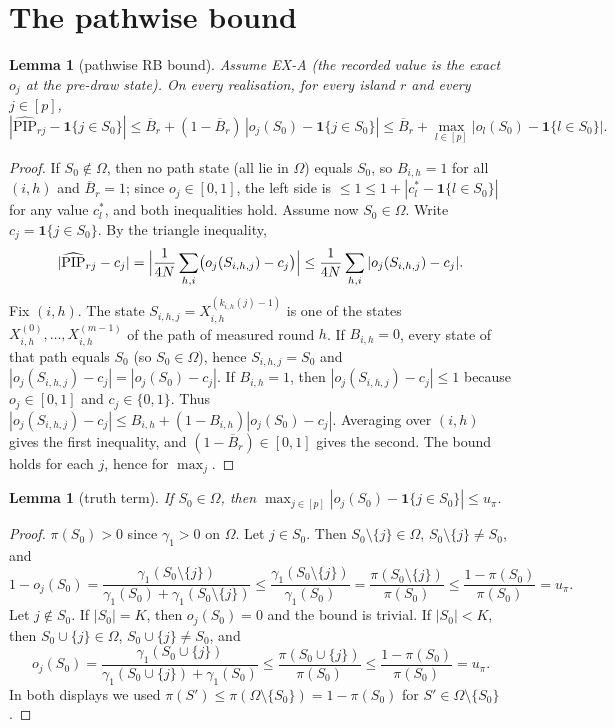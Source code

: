 \documentclass[11pt]{article}
\newtheorem{lemma}[theorem]{Lemma}
\theoremstyle{remark}
\newcommand{\one}{\mathbf 1}
\newcommand{\PIP}{\widehat{\mathrm{PIP}}}
\begin{document}
\section{The pathwise bound}

\begin{lemma}[pathwise RB bound]\label{lem:pathwise}
Assume EX-A (the recorded value is the exact $o_j$ at the pre-draw state). On every realisation, for every island $r$ and every $j\in[p]$,
\[
|\PIP_{rj}-\one\{j\in S_0\}|\le \overline B_r+(1-\overline B_r)\,|o_j(S_0)-\one\{j\in S_0\}|
\le \overline B_r+\max_{l\in[p]}|o_l(S_0)-\one\{l\in S_0\}|.
\]
\end{lemma}

\begin{proof}
If $S_0\notin\Omega$, then no path state (all lie in $\Omega$) equals $S_0$, so $B_{i,h}=1$ for all $(i,h)$ and $\overline B_r=1$; since $o_j\in[0,1]$, the left side is $\le1\le1+|c_l^\ast-\one\{l\in S_0\}|$ for any value $c_l^\ast$, and both inequalities hold. Assume now $S_0\in\Omega$.
Write $c_j=\one\{j\in S_0\}$. By the triangle inequality,
\[
|\PIP_{rj}-c_j|=\Bigl|\frac1{4N}\sum_{h,i}\bigl(o_j(S_{i,h,j})-c_j\bigr)\Bigr|\le\frac1{4N}\sum_{h,i}|o_j(S_{i,h,j})-c_j| .
\]
Fix $(i,h)$. The state $S_{i,h,j}=X^{(k_{i,h}(j)-1)}_{i,h}$ is one of the states $X^{(0)}_{i,h},\dots,X^{(m-1)}_{i,h}$ of the path of measured round $h$.
If $B_{i,h}=0$, every state of that path equals $S_0$ (so $S_0\in\Omega$), hence $S_{i,h,j}=S_0$ and $|o_j(S_{i,h,j})-c_j|=|o_j(S_0)-c_j|$.
If $B_{i,h}=1$, then $|o_j(S_{i,h,j})-c_j|\le1$ because $o_j\in[0,1]$ and $c_j\in\{0,1\}$.
Thus $|o_j(S_{i,h,j})-c_j|\le B_{i,h}+(1-B_{i,h})|o_j(S_0)-c_j|$. Averaging over $(i,h)$ gives the first inequality, and $(1-\overline B_r)\in[0,1]$ gives the second. The bound holds for each $j$, hence for $\max_j$.
\end{proof}

\begin{lemma}[truth term]\label{lem:truth}
If $S_0\in\Omega$, then $\max_{j\in[p]}|o_j(S_0)-\one\{j\in S_0\}|\le u_\pi$.
\end{lemma}

\begin{proof}
$\pi(S_0)>0$ since $\gamma_1>0$ on $\Omega$. Let $j\in S_0$. Then $S_0\setminus\{j\}\in\Omega$, $S_0\setminus\{j\}\neq S_0$, and
\[
1-o_j(S_0)=\frac{\gamma_1(S_0\setminus\{j\})}{\gamma_1(S_0)+\gamma_1(S_0\setminus\{j\})}\le\frac{\gamma_1(S_0\setminus\{j\})}{\gamma_1(S_0)}=\frac{\pi(S_0\setminus\{j\})}{\pi(S_0)}\le\frac{1-\pi(S_0)}{\pi(S_0)}=u_\pi .
\]
Let $j\notin S_0$. If $|S_0|=K$, then $o_j(S_0)=0$ and the bound is trivial. If $|S_0|<K$, then $S_0\cup\{j\}\in\Omega$, $S_0\cup\{j\}\ne S_0$, and
\[
o_j(S_0)=\frac{\gamma_1(S_0\cup\{j\})}{\gamma_1(S_0\cup\{j\})+\gamma_1(S_0)}\le\frac{\pi(S_0\cup\{j\})}{\pi(S_0)}\le\frac{1-\pi(S_0)}{\pi(S_0)}=u_\pi .
\]
In both displays we used $\pi(S')\le\pi(\Omega\setminus\{S_0\})=1-\pi(S_0)$ for $S'\in\Omega\setminus\{S_0\}$.
\end{proof}
\end{document}
